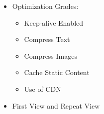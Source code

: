 \begin{itemize}
\item Optimization Grades:
	\begin{itemize}
	\item Keep-alive Enabled
	\item Compress Text
	\item Compress Images
	\item Cache Static Content
	\item Use of CDN
	\end{itemize}
\item First View and Repeat View
\end{itemize}






